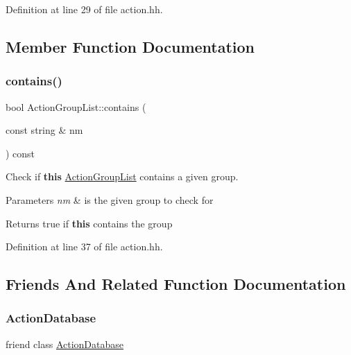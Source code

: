 Definition at line 29 of file action.\+hh.



\subsection{Member Function Documentation}
\mbox{\label{class_action_group_list_a1da632f21f5671ecabc3c0551e787041}} 
\subsubsection{\texorpdfstring{contains()}{contains()}}
{\footnotesize\ttfamily bool Action\+Group\+List\+::contains (\begin{DoxyParamCaption}\item[{const string \&}]{nm }\end{DoxyParamCaption}) const\hspace{0.3cm}{\ttfamily [inline]}}



Check if {\bfseries{this}} \mbox{\hyperlink{class_action_group_list}{Action\+Group\+List}} contains a given group. 


\begin{DoxyParams}{Parameters}
{\em nm} & is the given group to check for \\
\hline
\end{DoxyParams}
\begin{DoxyReturn}{Returns}
true if {\bfseries{this}} contains the group 
\end{DoxyReturn}


Definition at line 37 of file action.\+hh.



\subsection{Friends And Related Function Documentation}
\mbox{\label{class_action_group_list_ab2339bb3393a889e3deb566638006958}} 
\subsubsection{\texorpdfstring{ActionDatabase}{ActionDatabase}}
{\footnotesize\ttfamily friend class \mbox{\hyperlink{class_action_database}{Action\+Database}}\hspace{0.3cm}{\ttfamily [friend]}}




